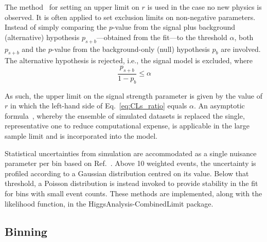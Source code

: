 The \CLs method~\cite{Read_2002} for setting an upper limit on $r$ is used in the case no new physics is observed. It is often applied to set exclusion limits on non-negative parameters. Instead of simply comparing the $p$-value from the signal plus background (alternative) hypothesis $p_{s+b}$---obtained from the fit---to the threshold $\alpha$, both $p_{s+b}$ and the $p$-value from the background-only (null) hypothesis $p_b$ are involved. The alternative hypothesis is rejected, i.e., the signal model is excluded, where
\begin{equation}
    \frac{p_{s+b}}{1 - p_b} \leq \alpha
    \label{eq:CLs_ratio}
\end{equation}

As such, the upper limit on the signal strength parameter is given by the value of $r$ in which the left-hand side of Eq.~\ref{eq:CLs_ratio} equals $\alpha$. An asymptotic formula~\cite{Cowan:2010js}, whereby the ensemble of simulated datasets is replaced the single, representative one to reduce computational expense, is applicable in the large sample limit and is incorporated into the model.

Statistical uncertainties from simulation are accommodated as a single nuisance parameter per bin based on Ref.~. Above 10 weighted events, the uncertainty is profiled according to a Gaussian distribution centred on its value. Below that threshold, a Poisson distribution is instead invoked to provide stability in the fit for bins with small event counts. These methods are implemented, along with the likelihood function, in the \textsf{HiggsAnalysis-CombinedLimit} package.






\subsection{Binning}
\label{subsec:htoinv_binning}

